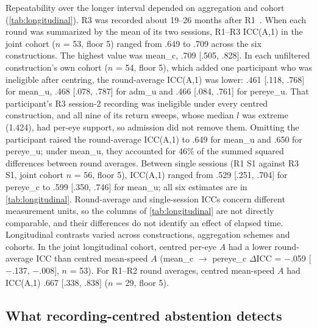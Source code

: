 Repeatability over the longer interval depended on aggregation and cohort (\cref{tab:longitudinal}). R3 was recorded about 19--26 months after R1~\citep{lohr2023}. When each round was summarized by the mean of its two sessions, R1--R3 ICC(A,1) in the joint cohort ($n$ = 53, floor 5) ranged from .649 to .709 across the six constructions. The highest value was mean\_c, .709 [.505, .828]. In each unfiltered construction's own cohort ($n$ = 54, floor 5), which added one participant who was ineligible after centring, the round-average ICC(A,1) was lower: .461 [.118, .768] for mean\_u, .468 [.078, .787] for adm\_u and .466 [.084, .761] for pereye\_u. That participant's R3 session-2 recording was ineligible under every centred construction, and all nine of its return sweeps, whose median $l$ was extreme (1.424), had per-eye support, so admission did not remove them. Omitting the participant raised the round-average ICC(A,1) to .649 for mean\_u and .650 for pereye\_u; under mean\_u, they accounted for 46\% of the summed squared differences between round averages. Between single sessions (R1 S1 against R3 S1, joint cohort $n$ = 56, floor 5), ICC(A,1) ranged from .529 [.251, .704] for pereye\_c to .599 [.350, .746] for mean\_u; all six estimates are in \cref{tab:longitudinal}. Round-average and single-session ICCs concern different measurement units, so the columns of \cref{tab:longitudinal} are not directly comparable, and their differences do not identify an effect of elapsed time. Longitudinal contrasts varied across constructions, aggregation schemes and cohorts. In the joint longitudinal cohort, centred per-eye $A$ had a lower round-average ICC than centred mean-speed $A$ (mean\_c $\to$ pereye\_c $\Delta$ICC = $-$.059 [$-$.137, $-$.008], $n$ = 53). For R1--R2 round averages, centred mean-speed $A$ had ICC(A,1) .667 [.338, .838] ($n$ = 29, floor 5).



\subsection{What recording-centred abstention detects}

